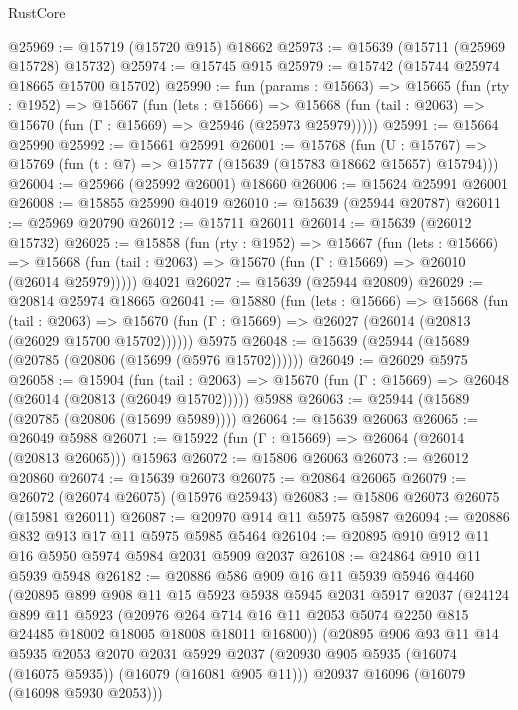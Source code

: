 \begin{lexlean}{RustCore}
\begin{coremodule}
@25969 := @15719 (@15720 @915) @18662
@25973 := @15639 (@15711 (@25969 @15728) @15732)
@25974 := @15745 @915
@25979 := @15742 (@15744 @25974 @18665 @15700 @15702)
@25990 := fun (params : @15663) =>
  @15665
    (fun (rty : @1952) =>
    @15667
      (fun (lets : @15666) =>
      @15668 (fun (tail : @2063) => @15670 (fun (Γ : @15669) => @25946 (@25973 @25979)))))
@25991 := @15664 @25990
@25992 := @15661 @25991
@26001 := @15768
    (fun (U : @15767) => @15769 (fun (t : @7) => @15777 (@15639 (@15783 @18662 @15657) @15794)))
@26004 := @25966 (@25992 @26001) @18660
@26006 := @15624 @25991 @26001
@26008 := @15855 @25990 @4019
@26010 := @15639 (@25944 @20787)
@26011 := @25969 @20790
@26012 := @15711 @26011
@26014 := @15639 (@26012 @15732)
@26025 := @15858
    (fun (rty : @1952) =>
    @15667
      (fun (lets : @15666) =>
      @15668 (fun (tail : @2063) => @15670 (fun (Γ : @15669) => @26010 (@26014 @25979)))))
    @4021
@26027 := @15639 (@25944 @20809)
@26029 := @20814 @25974 @18665
@26041 := @15880
    (fun (lets : @15666) =>
    @15668
      (fun (tail : @2063) =>
      @15670 (fun (Γ : @15669) => @26027 (@26014 (@20813 (@26029 @15700 @15702))))))
    @5975
@26048 := @15639 (@25944 (@15689 (@20785 (@20806 (@15699 (@5976 @15702))))))
@26049 := @26029 @5975
@26058 := @15904
    (fun (tail : @2063) => @15670 (fun (Γ : @15669) => @26048 (@26014 (@20813 (@26049 @15702)))))
    @5988
@26063 := @25944 (@15689 (@20785 (@20806 (@15699 @5989))))
@26064 := @15639 @26063
@26065 := @26049 @5988
@26071 := @15922 (fun (Γ : @15669) => @26064 (@26014 (@20813 @26065))) @15963
@26072 := @15806 @26063
@26073 := @26012 @20860
@26074 := @15639 @26073
@26075 := @20864 @26065
@26079 := @26072 (@26074 @26075) (@15976 @25943)
@26083 := @15806 @26073 @26075 (@15981 @26011)
@26087 := @20970 @914 @11 @5975 @5987
@26094 := @20886 @832 @913 @17 @11 @5975 @5985 @5464
@26104 := @20895 @910 @912 @11 @16 @5950 @5974 @5984 @2031 @5909 @2037
@26108 := @24864 @910 @11 @5939 @5948
@26182 := @20886
    @586
    @909
    @16
    @11
    @5939
    @5946
    @4460
    (@20895
      @899
      @908
      @11
      @15
      @5923
      @5938
      @5945
      @2031
      @5917
      @2037
      (@24124
        @899
        @11
        @5923
        (@20976 @264 @714 @16 @11 @2053 @5074 @2250 @815 @24485 @18002 @18005 @18008 @18011 @16800))
      (@20895
        @906
        @93
        @11
        @14
        @5935
        @2053
        @2070
        @2031
        @5929
        @2037
        (@20930 @905 @5935 (@16074 (@16075 @5935)) (@16079 (@16081 @905 @11)))
        @20937
        @16096
        (@16079 (@16098 @5930 @2053)))

\end{coremodule}
\end{lexlean}
